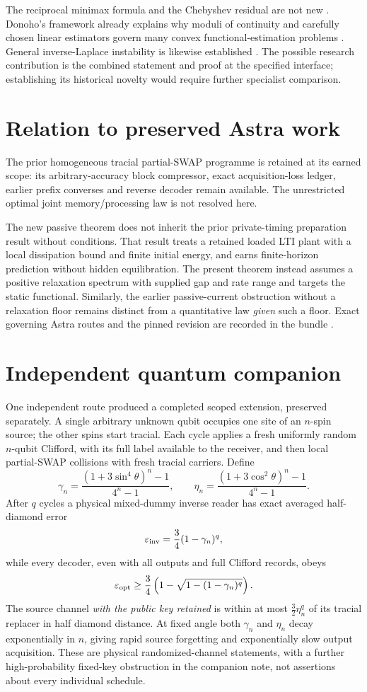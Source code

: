 \documentclass[11pt,a4paper]{article}
\begin{document}
The reciprocal minimax formula and the Chebyshev residual are not new \cite{kraus}. Donoho's framework already explains why moduli of continuity and carefully chosen linear estimators govern many convex functional-estimation problems \cite{donoho}. General inverse-Laplace instability is likewise established \cite{epstein}. The possible research contribution is the combined statement and proof at the specified interface; establishing its historical novelty would require further specialist comparison.

\section{Relation to preserved Astra work}

The prior homogeneous tracial partial-SWAP programme is retained at its earned scope: its arbitrary-accuracy block compressor, exact acquisition-loss ledger, earlier prefix converses and reverse decoder remain available. The unrestricted optimal joint memory/processing law is not resolved here.

The new passive theorem does not inherit the prior private-timing preparation result without conditions. That result treats a retained loaded LTI plant with a local dissipation bound and finite initial energy, and earns finite-horizon prediction without hidden equilibration. The present theorem instead assumes a positive relaxation spectrum with supplied gap and rate range and targets the static functional. Similarly, the earlier passive-current obstruction without a relaxation floor remains distinct from a quantitative law \emph{given} such a floor. Exact governing Astra routes and the pinned revision are recorded in the bundle \cite{astra}.

\section{Independent quantum companion}

One independent route produced a completed scoped extension, preserved separately. A single arbitrary unknown qubit occupies one site of an $n$-spin source; the other spins start tracial. Each cycle applies a fresh uniformly random $n$-qubit Clifford, with its full label available to the receiver, and then local partial-SWAP collisions with fresh tracial carriers. Define
\[
\gamma_n=\frac{(1+3\sin^4\theta)^n-1}{4^n-1},\qquad
\eta_n=\frac{(1+3\cos^2\theta)^n-1}{4^n-1}.
\]
After $q$ cycles a physical mixed-dummy inverse reader has exact averaged half-diamond error
\[
\varepsilon_{\rm inv}=\frac34(1-\gamma_n)^q,
\]
while every decoder, even with all outputs and full Clifford records, obeys
\[
\varepsilon_{\rm opt}\geq
\frac34\left(1-\sqrt{1-(1-\gamma_n)^q}\right).
\]
The source channel \emph{with the public key retained} is within at most $\tfrac32\eta_n^q$ of its tracial replacer in half diamond distance. At fixed angle both $\gamma_n$ and $\eta_n$ decay exponentially in $n$, giving rapid source forgetting and exponentially slow output acquisition. These are physical randomized-channel statements, with a further high-probability fixed-key obstruction in the companion note, not assertions about every individual schedule.
\end{document}
